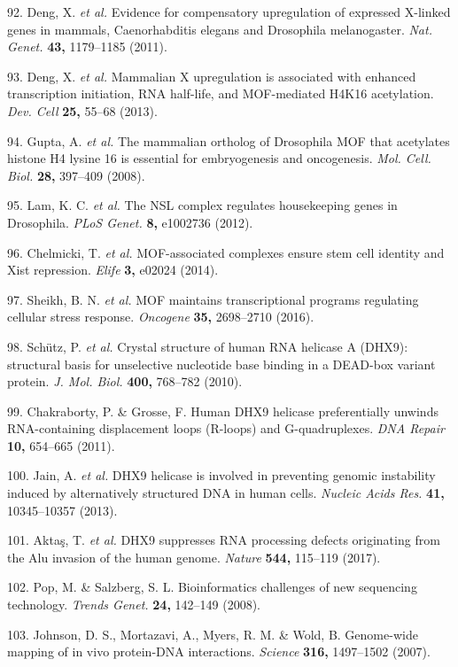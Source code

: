 \documentclass[11pt,twoside]{MPIthesis}
\theoremstyle{definition}
\theoremstyle{definition}
\theoremstyle{definition}
\theoremstyle{remark}
\begin{document}
92. Deng, X. \emph{et al.} Evidence for compensatory upregulation of
expressed X-linked genes in mammals, Caenorhabditis elegans and
Drosophila melanogaster. \emph{Nat. Genet.} \textbf{43,} 1179--1185
(2011).

93. Deng, X. \emph{et al.} Mammalian X upregulation is associated with
enhanced transcription initiation, RNA half-life, and MOF-mediated H4K16
acetylation. \emph{Dev. Cell} \textbf{25,} 55--68 (2013).

94. Gupta, A. \emph{et al.} The mammalian ortholog of Drosophila MOF
that acetylates histone H4 lysine 16 is essential for embryogenesis and
oncogenesis. \emph{Mol. Cell. Biol.} \textbf{28,} 397--409 (2008).

95. Lam, K. C. \emph{et al.} The NSL complex regulates housekeeping
genes in Drosophila. \emph{PLoS Genet.} \textbf{8,} e1002736 (2012).

96. Chelmicki, T. \emph{et al.} MOF-associated complexes ensure stem
cell identity and Xist repression. \emph{Elife} \textbf{3,} e02024
(2014).

97. Sheikh, B. N. \emph{et al.} MOF maintains transcriptional programs
regulating cellular stress response. \emph{Oncogene} \textbf{35,}
2698--2710 (2016).

98. Schütz, P. \emph{et al.} Crystal structure of human RNA helicase A
(DHX9): structural basis for unselective nucleotide base binding in a
DEAD-box variant protein. \emph{J. Mol. Biol.} \textbf{400,} 768--782
(2010).

99. Chakraborty, P. \& Grosse, F. Human DHX9 helicase preferentially
unwinds RNA-containing displacement loops (R-loops) and G-quadruplexes.
\emph{DNA Repair} \textbf{10,} 654--665 (2011).

100. Jain, A. \emph{et al.} DHX9 helicase is involved in preventing
genomic instability induced by alternatively structured DNA in human
cells. \emph{Nucleic Acids Res.} \textbf{41,} 10345--10357 (2013).

101. Aktaş, T. \emph{et al.} DHX9 suppresses RNA processing defects
originating from the Alu invasion of the human genome. \emph{Nature}
\textbf{544,} 115--119 (2017).

102. Pop, M. \& Salzberg, S. L. Bioinformatics challenges of new
sequencing technology. \emph{Trends Genet.} \textbf{24,} 142--149
(2008).

103. Johnson, D. S., Mortazavi, A., Myers, R. M. \& Wold, B. Genome-wide
mapping of in vivo protein-DNA interactions. \emph{Science}
\textbf{316,} 1497--1502 (2007).
\end{document}

